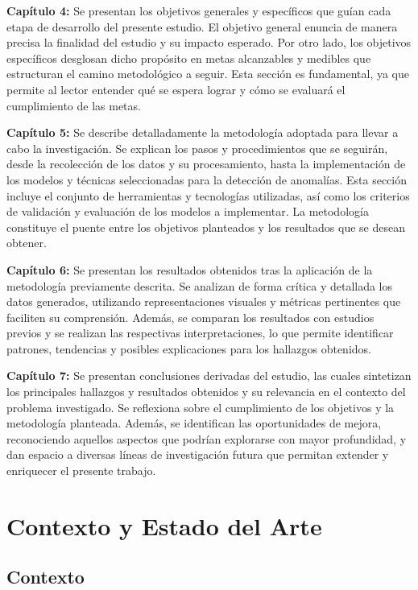\documentclass[11pt,a4paper,spanish]{book}
\numberwithin{equation}{chapter}
\numberwithin{figure}{chapter}
\begin{document}
\textbf{Capítulo 4:} Se presentan los objetivos generales y específicos que guían cada 
etapa de desarrollo del presente estudio. 
El objetivo general enuncia de manera precisa la finalidad del estudio y su impacto 
esperado. 
Por otro lado, los objetivos específicos desglosan dicho propósito en metas alcanzables 
y medibles que estructuran el camino metodológico a seguir. 
Esta sección es fundamental, ya que permite al lector entender qué se espera lograr y 
cómo se evaluará el cumplimiento de las metas.


\textbf{Capítulo 5:} Se describe detalladamente la metodología adoptada para llevar a 
cabo la investigación. 
Se explican los pasos y procedimientos que se seguirán, desde la recolección de los 
datos y su procesamiento, hasta la implementación de los modelos y técnicas 
seleccionadas para la detección de anomalías. 
Esta sección incluye el conjunto de herramientas y tecnologías utilizadas, así como los 
criterios de validación y evaluación de los modelos a implementar. 
La metodología constituye el puente entre los objetivos planteados y los resultados que
se desean obtener.


\textbf{Capítulo 6:} Se presentan los resultados obtenidos tras la aplicación de la 
metodología previamente descrita. 
Se analizan de forma crítica y detallada los datos generados, utilizando 
representaciones visuales y métricas pertinentes que faciliten su comprensión. 
Además, se comparan los resultados con estudios previos y se realizan las respectivas 
interpretaciones, lo que permite identificar patrones, tendencias y posibles 
explicaciones para los hallazgos obtenidos. 


\textbf{Capítulo 7:} Se presentan conclusiones derivadas del estudio, las cuales 
sintetizan los principales hallazgos y resultados obtenidos y su relevancia en el 
contexto del problema investigado. 
Se reflexiona sobre el cumplimiento de los objetivos y la metodología planteada. 
Además, se identifican las oportunidades de mejora, reconociendo aquellos aspectos 
que podrían explorarse con mayor profundidad, y dan espacio a diversas líneas de 
investigación futura que permitan extender y enriquecer el presente trabajo.


\chapter{Contexto y Estado del Arte}

\section{Contexto}
\end{document}

